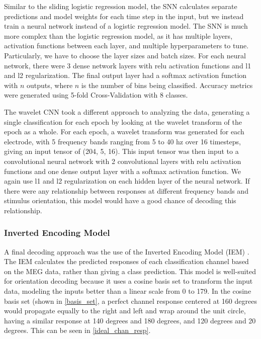 \documentclass[../main.tex]{subfiles}
\begin{document}
Similar to the sliding logistic regression model, the SNN calculates separate predictions and model weights for each time step in the input, but we instead train a neural network instead of a logistic regression model. The SNN is much more complex than the logistic regression model, as it has multiple layers, activation functions between each layer, and multiple hyperparameters to tune. Particularly, we have to choose the layer sizes and batch sizes. For each neural network, there were 3 dense network layers with relu activation functions and l1 and l2 regularization. The final output layer had a softmax activation function with $n$ outputs, where $n$ is the number of bins being classified. Accuracy metrics were generated using 5-fold Cross-Validation with 8 classes.

The wavelet CNN took a different approach to analyzing the data, generating a single classification for each epoch by looking at the wavelet transform of the epoch as a whole. For each epoch, a wavelet transform was generated for each electrode, with 5 frequency bands ranging from 5 to 40 hz over 16 timesteps, giving an input tensor of (204, 5, 16). This input tensor was then input to a convolutional neural network with 2 convolutional layers with relu activation functions and one dense output layer with a softmax activation function. We again use l1 and l2 regularization on each hidden layer of the neural network. If there were any relationship between responses at different frequency bands and stimulus orientation, this model would have a good chance of decoding this relationship.


\subsubsection{Inverted Encoding Model}
A final decoding approach was the use of the Inverted Encoding Model (IEM) \citep{Brouwer09, Brouwer, GARCIA2013515,sprague_serences_2013, sprague_saproo_serences_2015}. The IEM calculates the predicted responses of each classification channel based on the MEG data, rather than giving a class prediction. This model is well-suited for orientation decoding because it uses a cosine basis set to transform the input data, modeling the inputs better than a linear scale from 0 to 179. In the cosine basis set (shown in \ref{basis_set}, a perfect channel response centered at 160 degrees would propagate equally to the right and left and wrap around the unit circle, having a similar response at 140 degrees and 180 degrees, and 120 degrees and 20 degrees. This can be seen in \ref{ideal_chan_resp}. 
\end{document}
